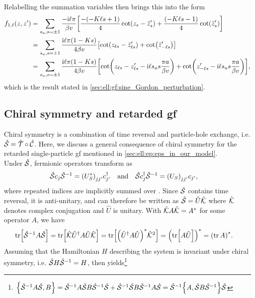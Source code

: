 Relabelling the summation variables then brings this into the form
\begin{align*}
f_{1,\ell}(z,z') &= \sum_{s_a,s=\pm 1} \frac{-\i\ell \pi}{\beta v} \klb*{\frac{-(-K\ell s + 1)}{4} \cot(z_s - \tilde{z}_s') + \frac{(-K\ell s - 1)}{4} \cot(\tilde{z}_s')}\\
&= \sum_{s_a,s=\pm 1} \frac{\i\ell \pi (1-Ks)}{4\beta v} \klb*{\cot(z_{\ell s} - \tilde{z}_{\ell s}') + \cot(\tilde{z}_{-\ell s}')}\\
&= \sum_{s_a,s=\pm 1} \frac{\i\ell \pi (1-Ks)}{4\beta v} \klb*{\cot(z_{\ell s} - z_{\ell s}' - \i\ell s_a s \frac{\pi a}{\beta v}) + \cot(z_{-\ell s}' - \i\ell s_a s \frac{\pi a}{\beta v})},
\end{align*}
which is the result stated in \autoref{sec:ell:gf:sine_Gordon_perturbation}.
\subsection{Chiral symmetry and retarded \texorpdfstring{\acrshort{gf}}{GF}}\label{sec:app:chiral_symmetry_gf}
Chiral symmetry is a combination of time reversal and particle-hole exchange, i.e. $\hat{\mathcal{S}} = \hat{\mathcal{T}} \circ \hat{\mathcal{C}}$.
Here, we discuss a general consequence of chiral symmetry for the retarded single-particle \gls{gf} mentioned in \autoref{sec:ell:ep:eps_in_our_model}.\\
Under $\hat{\mathcal{S}}$, fermionic operators transform as
\begin{align}
\chs c_j \chs^{-1} &= \kla*{U_S^\ast}_{jj'} c_{j'}^\dagger \quad \text{and} \quad \chs c_j^\dagger \chs^{-1} = \kla*{U_S}_{jj'} c_{j'}, \label{eqn:app:chiral_cj_transform}
\end{align}
where repeated indices are implicitly summed over \cite[\ssec II.C]{NHT_Classification_Chiu_2016}.
Since $\hat{\mathcal{S}}$ contains time reversal, it is anti-unitary, and can therefore be written as $\hat{\mathcal{S}} = \hat{U} \hat{\mathcal{K}}$ where $\hat{\mathcal{K}}$ denotes complex conjugation and $\hat{U}$ is unitary.
With $\hat{\mathcal{K}} A \hat{\mathcal{K}} = A^\ast$ for some operator $A$, we have
\begin{align*}
\tr\klb*{\chs^{-1} A \chs} &= \tr\klb*{\ccg \hat{U}^\dagger A \hat{U} \ccg} = \tr\klb*{\kla*{\hat{U}^\dagger A \hat{U}}^\ast \ccg^2} = \kla*{ \tr\klb*{A \hat{U}}}^\ast = \kla*{\tr A}^\ast.
\end{align*}
Assuming that the Hamiltonian $H$ describing the system is invariant under chiral symmetry, i.e. $\hat{\mathcal{S}} H \hat{\mathcal{S}}^{-1} = H$, then yields\footnote{$\klc*{\chs^{-1} A \chs, B} = \chs^{-1}A\chs B \chs^{-1} \chs + \chs^{-1} \chs B \chs^{-1} A \chs = \chs^{-1} \klc*{A, \chs B \chs^{-1}} \chs$}
